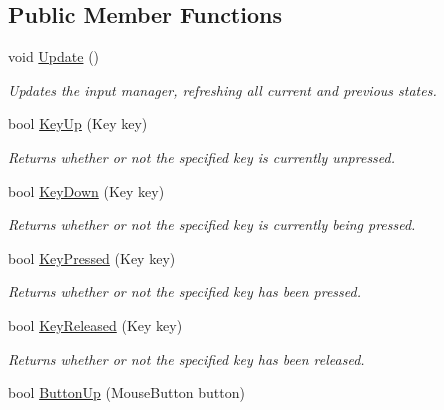 \subsection*{Public Member Functions}
\begin{DoxyCompactItemize}
\item 
void \hyperlink{class_tri_devs_1_1_tri_engine2_d_1_1_input_1_1_null_input_manager_a7713c34aa9dea7d6f0878e9c99217df3}{Update} ()
\begin{DoxyCompactList}\small\item\em Updates the input manager, refreshing all current and previous states. \end{DoxyCompactList}\item 
bool \hyperlink{class_tri_devs_1_1_tri_engine2_d_1_1_input_1_1_null_input_manager_a4d8adbdf820de7ca44cd2781c209a5ba}{Key\-Up} (Key key)
\begin{DoxyCompactList}\small\item\em Returns whether or not the specified key is currently unpressed. \end{DoxyCompactList}\item 
bool \hyperlink{class_tri_devs_1_1_tri_engine2_d_1_1_input_1_1_null_input_manager_a1079920f69a7fec078a52f99be45b24a}{Key\-Down} (Key key)
\begin{DoxyCompactList}\small\item\em Returns whether or not the specified key is currently being pressed. \end{DoxyCompactList}\item 
bool \hyperlink{class_tri_devs_1_1_tri_engine2_d_1_1_input_1_1_null_input_manager_a2de0da3893be579c99690caa0d3cd2cc}{Key\-Pressed} (Key key)
\begin{DoxyCompactList}\small\item\em Returns whether or not the specified key has been pressed. \end{DoxyCompactList}\item 
bool \hyperlink{class_tri_devs_1_1_tri_engine2_d_1_1_input_1_1_null_input_manager_aadf04bc0e73da9612c1cdd435fdb6867}{Key\-Released} (Key key)
\begin{DoxyCompactList}\small\item\em Returns whether or not the specified key has been released. \end{DoxyCompactList}\item 
bool \hyperlink{class_tri_devs_1_1_tri_engine2_d_1_1_input_1_1_null_input_manager_aa673576f2f8d44329d7876c6a450e44c}{Button\-Up} (Mouse\-Button button)

\end{DoxyCompactItemize}
